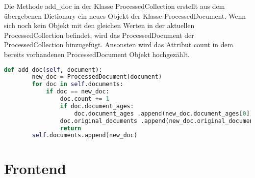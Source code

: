 Die Methode add\_doc in der Klasse ProcessedCollection erstellt aus dem übergebenen Dictionary ein neues Objekt der Klasse ProcessedDocument.
Wenn sich noch kein Objekt mit den gleichen Werten in der aktuellen ProcessedCollection befindet, wird das ProcessedDocument der ProcessedCollection hinzugefügt.
Ansonsten wird das Attribut count in dem bereits vorhandenen ProcessedDocument Objekt hochgezählt.


\begin{lstlisting}[language=python, caption={ProcessedCollection.add\_doc},label={lst:backend_add_doc}]
    def add_doc(self, document):
        new_doc = ProcessedDocument(document)
        for doc in self.documents:
            if doc == new_doc:
                doc.count += 1
                if doc.document_ages:
                    doc.document_ages .append(new_doc.document_ages[0])
                doc.original_documents .append(new_doc.original_documents[0])
                return
        self.documents.append(new_doc)
\end{lstlisting}

\section{Frontend}
\label{sec:frontend}

\subsection{}
\label{sub:rest_api}

